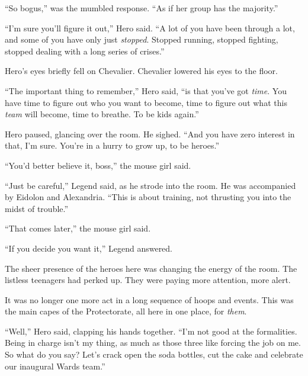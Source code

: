 ``So bogus,'' was the mumbled response.  ``As if her group has the majority.''



``I'm sure you'll figure it out,'' Hero said.  ``A lot of you have been through a lot, and some of you have only just \emph{stopped}.  Stopped running, stopped fighting, stopped dealing with a long series of crises.''



Hero's eyes briefly fell on Chevalier.  Chevalier lowered his eyes to the floor.



``The important thing to remember,'' Hero said, ``is that you've got \emph{time}.  You have time to figure out who you want to become, time to figure out what this \emph{team} will become, time to breathe.  To be kids again.''



Hero paused, glancing over the room.  He sighed.  ``And you have zero interest in that, I'm sure.  You're in a hurry to grow up, to be heroes.''



``You'd better believe it, boss,'' the mouse girl said.



``Just be careful,'' Legend said, as he strode into the room.  He was accompanied by Eidolon and Alexandria.  ``This is about training, not thrusting you into the midst of trouble.''



``That comes later,'' the mouse girl said.



``If you decide you want it,'' Legend answered.



The sheer presence of the heroes here was changing the energy of the room.  The listless teenagers had perked up.  They were paying more attention, more alert.



It was no longer one more act in a long sequence of hoops and events.  This was the main capes of the Protectorate, all here in one place, for \emph{them}.



``Well,'' Hero said, clapping his hands together.  ``I'm not good at the formalities.  Being in charge isn't my thing, as much as those three like forcing the job on me.  So what do you say?  Let's crack open the soda bottles, cut the cake and celebrate our inaugural Wards team.''



